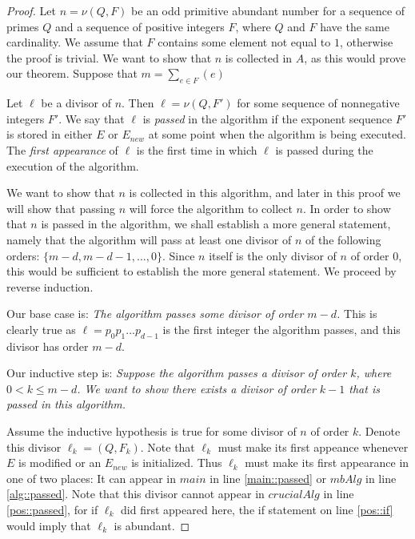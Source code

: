 \documentclass[../paper.tex]{subfiles}
\begin{document}
\begin{proof}
  Let $n = \nu (Q, F)$ be an odd primitive abundant number for a
sequence of primes $Q$ and a sequence of positive integers $F$,
where $Q$ and $F$ have the same cardinality. We assume that 
$F$ contains some element not equal to $1$, otherwise the proof
is trivial. We want to show that
$n$ is collected in $A$, as this would prove our theorem.
Suppose that $m = \sum_{e \in F}(e)$

  Let $\ell$ be a divisor of $n$. Then $\ell = \nu (Q, F')$ for
some sequence of nonnegative integers $F'$. We say that $\ell$ is
\textit{passed} in the algorithm if the exponent sequence $F'$ is
stored in either $E$ or $E_{new}$ at some point when the algorithm is
being executed. The \textit{first appearance} of $\ell$ is the
first time in which $\ell$ is passed during the execution of the
algorithm.

  We want to show that $n$ is collected in this algorithm, and
later in this proof we will show that passing $n$ will force the
algorithm to collect $n$. In
order to show that $n$ is passed in the algorithm, we shall establish
a more general statement, namely that the algorithm will pass at least
one divisor of $n$ of the following orders: $\{m-d, m-d-1, ..., 0\}$.
Since $n$ itself is the only divisor of $n$ of order 0, this would be 
sufficient to establish the more general statement. We proceed by 
reverse induction.

Our base case is: \textit{The algorithm passes some divisor of order $m
- d$.} This is clearly true as $\ell = p_0 p_1 ... p_{d-1}$ is the 
first integer the algorithm passes, and this divisor has order 
$m-d$.

Our inductive step is:
\textit{Suppose the algorithm passes a divisor of order $k$,
where $0 < k \leq m - d $. We want to show there exists a divisor
of order $k - 1$ that is passed in this algorithm.}

Assume the inductive hypothesis is true for some divisor of $n$ of
order $k$. Denote this divisor $\ell_k = (Q, F_k)$. Note that
$\ell_k$ must make its first appeance whenever $E$ is modified
or an $E_{new}$ is initialized. Thus $\ell_k$ must make its first
appearance in one of two places: It can appear in $main$ in
line \ref{main::passed} or $mbAlg$ in line \ref{alg::passed}. 
Note that this divisor cannot appear in $crucialAlg$ in line
\ref{pos::passed}, for if $\ell_k$ did first appeared here, 
the if statement on line \ref{pos::if} would imply that $\ell_k$
is abundant.  


\end{proof}
\end{document}
